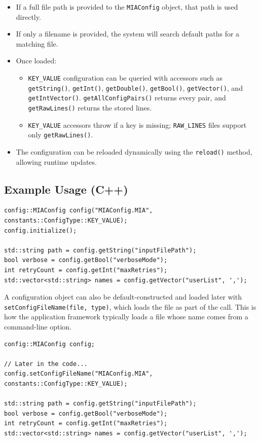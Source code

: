 \begin{itemize}\itemsep0em
	\item If a full file path is provided to the \texttt{MIAConfig} object, that path is used directly.
	\item If only a filename is provided, the system will search default paths for a matching file.
	\item Once loaded:
	\begin{itemize}\itemsep0em
		\item \texttt{KEY\_VALUE} configuration can be queried with accessors such as \texttt{getString()}, \texttt{getInt()}, \texttt{getDouble()}, \texttt{getBool()}, \texttt{getVector()}, and \texttt{getIntVector()}. \texttt{getAllConfigPairs()} returns every pair, and \texttt{getRawLines()} returns the stored lines.
		\item \texttt{KEY\_VALUE} accessors throw if a key is missing; \texttt{RAW\_LINES} files support only \texttt{getRawLines()}.
	\end{itemize}
	\item The configuration can be reloaded dynamically using the \texttt{reload()} method, allowing runtime updates.
\end{itemize}

\subsection*{Example Usage (C++)}

\begin{lstlisting}[style=cppstyle]
config::MIAConfig config("MIAConfig.MIA", constants::ConfigType::KEY_VALUE);
config.initialize();

std::string path = config.getString("inputFilePath");
bool verbose = config.getBool("verboseMode");
int retryCount = config.getInt("maxRetries");
std::vector<std::string> names = config.getVector("userList", ',');
\end{lstlisting}

A configuration object can also be default-constructed and loaded later with \texttt{setConfigFileName(file, type)}, which loads the file as part of the call. This is how the application framework typically loads a file whose name comes from a command-line option.

\begin{lstlisting}[style=cppstyle]
config::MIAConfig config;

// Later in the code...
config.setConfigFileName("MIAConfig.MIA", constants::ConfigType::KEY_VALUE);

std::string path = config.getString("inputFilePath");
bool verbose = config.getBool("verboseMode");
int retryCount = config.getInt("maxRetries");
std::vector<std::string> names = config.getVector("userList", ',');
\end{lstlisting}

